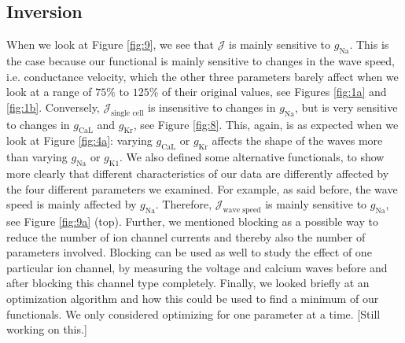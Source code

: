 \documentclass{article}
\begin{document}
\subsection{Inversion} \label{Inversion 2}
%
When we look at Figure \ref{fig:9}, we see that $\mathcal{J}$ is mainly sensitive to $g_{\mathrm{Na}}$. This is the case because our functional is mainly sensitive to changes in the wave speed, i.e. conductance velocity, which the other three parameters barely affect when we look at a range of $75\%$ to $125 \%$ of their original values, see Figures \ref{fig:1a} and \ref{fig:1b}. Conversely, $\mathcal{J}_{\text{single cell}}$ is insensitive to changes in $g_{\mathrm{Na}}$, but is very sensitive to changes in $g_{\mathrm{CaL}}$ and $g_{\mathrm{Kr}}$, see Figure \ref{fig:8}. This, again, is as expected when we look at Figure \ref{fig:4a}: varying $g_{\mathrm{CaL}}$ or $g_{\mathrm{Kr}}$ affects the shape of the waves more than varying $g_{\mathrm{Na}}$ or $g_{\mathrm{K1}}$. We also defined some alternative functionals, to show more clearly that different characteristics of our data are differently affected by the four different parameters we examined. For example, as said before, the wave speed is mainly affected by $g_{\mathrm{Na}}$. Therefore, $\mathcal{J}_{\text{wave speed}}$ is mainly sensitive to $g_{\mathrm{Na}}$, see Figure \ref{fig:9a} (top). Further, we mentioned blocking as a possible way to reduce the number of ion channel currents and thereby also the number of parameters involved. Blocking can be used as well to study the effect of one particular ion channel, by measuring the voltage and calcium waves before and after blocking this channel type completely.
Finally, we looked briefly at an optimization algorithm and how this could be used to find a minimum of our functionals. We only considered optimizing for one parameter at a time. [Still working on this.]
\end{document}
